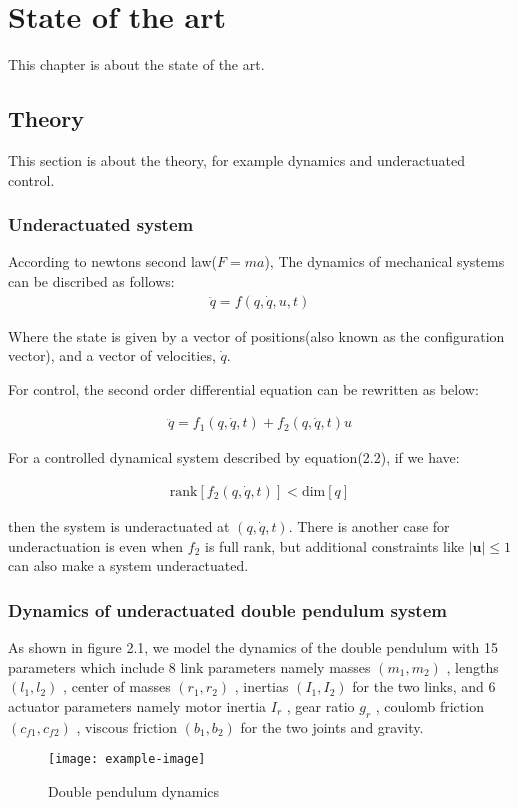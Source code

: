 \chapter{State of the art}
This chapter is about the state of the art.

\section{Theory}
This section is about the theory, for example dynamics and underactuated control.

\subsection{Underactuated system}
According to newtons second law(\( F = ma \)), The dynamics of mechanical systems can be discribed as follows:
\begin{align}
    \ddot{q} = f(q, \dot{q}, u, t)
\end{align}

Where the state is given by a vector of positions(also known as the configuration vector), and a vector of velocities, \( \dot{q}\).

For control, the second order differential equation can be rewritten as below:

\begin{align}
    \ddot{q} = f_1(q, \dot{q}, t) + f_2(q, \dot{q}, t)u
\end{align}

For a controlled dynamical system described by equation(2.2), if we have:

\begin{align}
    \text{rank}[f_2(q, \dot{q}, t)] < \text{dim}[q]
\end{align}

then the system is underactuated at \((q, \dot{q}, t)\). There is another case for underactuation is even when \(f_2\) is full rank, but additional constraints like \(|\mathbf{u}| \leq 1\) can also make a system underactuated.


\subsection{Dynamics of underactuated double pendulum system}
As shown in figure 2.1, we model the dynamics of the double pendulum with 15 parameters which include 8 link parameters namely masses \((m_1,m_2)\)
, lengths \((l_1,l_2)\)
, center of masses \((r_1,r_2)\) 
, inertias \((I_1,I_2)\)
 for the two links, and 6 actuator parameters namely motor inertia \(I_r\)
, gear ratio \(g_r\)
, coulomb friction \((c_{f1},c_{f2})\)
, viscous friction \((b_1,b_2)\)
 for the two joints and gravity.
\begin{figure}[h]
  \centering
  \texttt{[image: example-image]} %
  \caption{Double pendulum dynamics}
  \label{fig:sample}
\end{figure}

